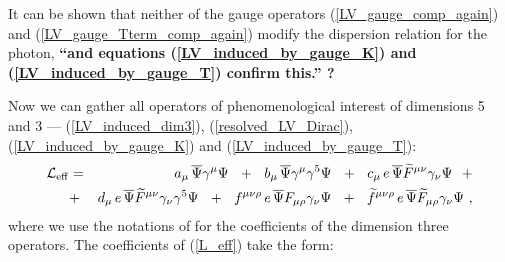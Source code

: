\documentclass[12pt]{revtex4}
\begin{document}
It can be shown 
\cite{GrootNibbelink:2004za}
that neither of the gauge operators 
(\ref{LV_gauge_comp_again}) and
(\ref{LV_gauge_Tterm_comp_again}) 
modify the dispersion relation for the photon,
{\bf ``and equations (\ref{LV_induced_by_gauge_K})
  and (\ref{LV_induced_by_gauge_T}) confirm this.'' ?}





Now we can gather all operators of phenomenological
interest of dimensions 5 and 3 --- 
(\ref{LV_induced_dim3}), (\ref{resolved_LV_Dirac}),
(\ref{LV_induced_by_gauge_K}) and
(\ref{LV_induced_by_gauge_T}):
\begin{eqnarray}
\label{L_eff}
  \mathcal{L}_{\rm eff}
        & = &
        a_\mu\, \overline{\Psi} \gamma^\mu \Psi
~~+~~
b_\mu\, \overline{\Psi} \gamma^\mu \gamma^5 \Psi
~~+~~
c_\mu\, e\, \overline{\Psi} \widetilde{F}^{\mu\nu}
                    \gamma_\nu \Psi
        ~~+\\
\nonumber
& + &
d_\mu\, e\, \overline{\Psi} \widetilde{F}^{\mu\nu}
                    \gamma_\nu \gamma^5 \Psi
        ~~+~~
        f^{\mu\nu\rho}\, 
     e\, \overline{\Psi} F_{\mu\rho} 
                 \gamma_\nu \Psi
~~+~~
\widetilde{f}^{\mu\nu\rho}\,
     e\, \overline{\Psi} \widetilde{F}_{\mu\rho} 
                 \gamma_\nu \Psi
~,
\end{eqnarray}
where we use the notations of 
\cite{Colladay:1998fq}
for the coefficients of the 
dimension three operators.
The coefficients of (\ref{L_eff}) take the form:
\end{document}
